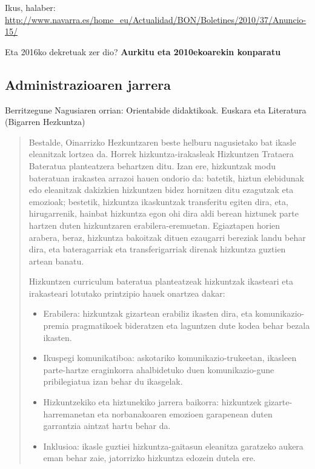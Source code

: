 \documentclass[
]{book}
\providecommand{\tightlist}{%
  \setlength{\itemsep}{0pt}\setlength{\parskip}{0pt}}
\begin{document}
Ikus, halaber: \url{http://www.navarra.es/home_eu/Actualidad/BON/Boletines/2010/37/Anuncio-15/}

Eta 2016ko dekretuak zer dio? \textbf{Aurkitu eta 2010ekoarekin konparatu}

\hypertarget{administrazioaren-jarrera}{%
\subsection{Administrazioaren jarrera}\label{administrazioaren-jarrera}}

Berritzegune Nagusiaren orrian: Orientabide didaktikoak. Euskara eta Literatura (Bigarren Hezkuntza)

\begin{quote}
Bestalde, Oinarrizko Hezkuntzaren beste helburu nagusietako bat ikasle eleanitzak lortzea da. Horrek hizkuntza-irakasleak Hizkuntzen Trataera Bateratua planteatzera behartzen ditu. Izan ere, hizkuntzak modu bateratuan irakastea arrazoi hauen ondorio da: batetik, hiztun elebidunak edo eleanitzak dakizkien hizkuntzen bidez hornitzen ditu ezagutzak eta emozioak; bestetik, hizkuntza ikaskuntzak transferitu egiten dira, eta, hirugarrenik, hainbat hizkuntza egon ohi dira aldi berean hiztunek parte hartzen duten hizkuntzaren erabilera-eremuetan. Egiaztapen horien arabera, beraz, hizkuntza bakoitzak dituen ezaugarri bereziak landu behar dira, eta bateragarriak eta transferigarriak direnak hizkuntza guztien artean banatu.

Hizkuntzen curriculum bateratua planteatzeak hizkuntzak ikasteari eta irakasteari lotutako printzipio hauek onartzea dakar:

\begin{itemize}
\tightlist
\item
  Erabilera: hizkuntzak gizartean erabiliz ikasten dira, eta komunikazio-premia pragmatikoek bideratzen eta laguntzen dute kodea behar bezala ikasten.
\item
  Ikuspegi komunikatiboa: askotariko komunikazio-trukeetan, ikasleen parte-hartze eraginkorra ahalbidetuko duen komunikazio-gune pribilegiatua izan behar du ikasgelak.
\item
  Hizkuntzekiko eta hiztunekiko jarrera baikorra: hizkuntzek gizarte-harremanetan eta norbanakoaren emozioen garapenean duten garrantzia aintzat hartu behar da.
\item
  Inklusioa: ikasle guztiei hizkuntza-gaitasun eleanitza garatzeko aukera eman behar zaie, jatorrizko hizkuntza edozein dutela ere.
\end{itemize}


\end{quote}
\end{document}
